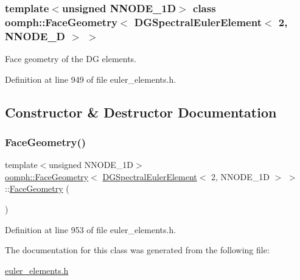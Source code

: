 \subsubsection*{template$<$unsigned N\+N\+O\+D\+E\+\_\+1D$>$\newline
class oomph\+::\+Face\+Geometry$<$ D\+G\+Spectral\+Euler\+Element$<$ 2, N\+N\+O\+D\+E\+\_\+D $>$ $>$}

Face geometry of the DG elements. 

Definition at line 949 of file euler\+\_\+elements.\+h.



\subsection{Constructor \& Destructor Documentation}
\mbox{\label{classoomph_1_1FaceGeometry_3_01DGSpectralEulerElement_3_012_00_01NNODE__1D_01_4_01_4_a647070055220d8524ddf70cf77968a1c}} 
\subsubsection{\texorpdfstring{Face\+Geometry()}{FaceGeometry()}}
{\footnotesize\ttfamily template$<$unsigned N\+N\+O\+D\+E\+\_\+1D$>$ \\
\hyperlink{classoomph_1_1FaceGeometry}{oomph\+::\+Face\+Geometry}$<$ \hyperlink{classoomph_1_1DGSpectralEulerElement}{D\+G\+Spectral\+Euler\+Element}$<$ 2, N\+N\+O\+D\+E\+\_\+1D $>$ $>$\+::\hyperlink{classoomph_1_1FaceGeometry}{Face\+Geometry} (\begin{DoxyParamCaption}{ }\end{DoxyParamCaption})\hspace{0.3cm}{\ttfamily [inline]}}



Definition at line 953 of file euler\+\_\+elements.\+h.



The documentation for this class was generated from the following file\+:\begin{DoxyCompactItemize}
\item 
\hyperlink{euler__elements_8h}{euler\+\_\+elements.\+h}\end{DoxyCompactItemize}
